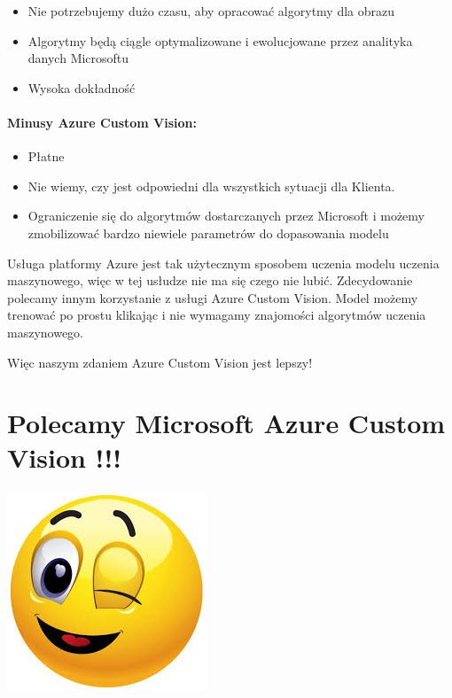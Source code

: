 \documentclass[11pt]{article}
\makeatletter
\providecommand{\tightlist}{%
      \setlength{\itemsep}{0pt}\setlength{\parskip}{0pt}}
\newcommand{\boxspacing}{\kern\kvtcb@left@rule\kern\kvtcb@boxsep}
\newcommand{\prompt}[4]{
        {\ttfamily\llap{{\color{#2}[#3]:\hspace{3pt}#4}}\vspace{-\baselineskip}}
    }
\makeatother
\begin{document}
\begin{itemize}
\tightlist
\item
  Nie potrzebujemy dużo czasu, aby opracować algorytmy dla obrazu
\item
  Algorytmy będą ciągle optymalizowane i ewolucjowane przez analityka
  danych Microsoftu
\item
  Wysoka dokładność
\end{itemize}

\hypertarget{minusy-azure-custom-vision}{%
\paragraph{Minusy Azure Custom
Vision:}\label{minusy-azure-custom-vision}}

\begin{itemize}
\tightlist
\item
  Płatne
\item
  Nie wiemy, czy jest odpowiedni dla wszystkich sytuacji dla Klienta.
\item
  Ograniczenie się do algorytmów dostarczanych przez Microsoft i możemy
  zmobilizować bardzo niewiele parametrów do dopasowania modelu
\end{itemize}

Usługa platformy Azure jest tak użytecznym sposobem uczenia modelu
uczenia maszynowego, więc w tej usłudze nie ma się czego nie lubić.
Zdecydowanie polecamy innym korzystanie z usługi Azure Custom Vision.
Model możemy trenować po prostu klikając i nie wymagamy znajomości
algorytmów uczenia maszynowego.

Więc naszym zdaniem Azure Custom Vision jest lepszy!

\hypertarget{polecamy-microsoft-azure-custom-vision}{%
\section{Polecamy Microsoft Azure Custom Vision
!!!}\label{polecamy-microsoft-azure-custom-vision}}

\includegraphics{image_report/smile.jpeg}

    \begin{tcolorbox}[breakable, size=fbox, boxrule=1pt, pad at break*=1mm,colback=cellbackground, colframe=cellborder]
\prompt{In}{incolor}{ }{\boxspacing}
\begin{Verbatim}[commandchars=\\\{\}]

\end{Verbatim}
\end{tcolorbox}


    
    
    
\end{document}
